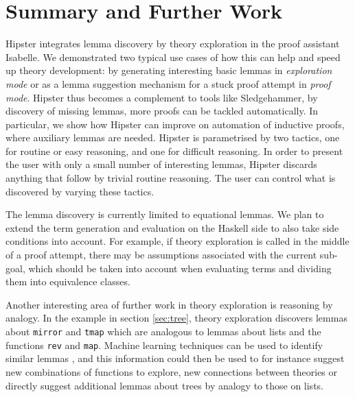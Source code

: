 \section{Summary and Further Work}
\label{sec:concl}

Hipster integrates lemma discovery by theory exploration in the proof assistant Isabelle. We demonstrated two typical use cases of how this can help and speed up theory development: by generating interesting basic lemmas in \emph{exploration mode} or as a lemma suggestion mechanism for a stuck proof attempt in \emph{proof mode}. Hipster thus becomes a complement to tools like Sledgehammer, by discovery of missing lemmas, more proofs can be tackled automatically. In particular, we show how Hipster can improve on automation of inductive proofs, where auxiliary lemmas are needed. Hipster is parametrised by two tactics, one for routine or easy reasoning, and one for difficult reasoning. In order to present the user with only a small number of interesting lemmas, Hipster discards anything that follow by trivial routine reasoning. The user can control what is discovered by varying these tactics.

The lemma discovery is currently limited to equational lemmas. We plan to extend the term generation and evaluation on the Haskell side to also take side conditions into account. For example, if theory exploration is called in the middle of a proof attempt, there may be assumptions associated with the current sub-goal, which should be taken into account when evaluating terms and dividing them into equivalence classes. 

Another interesting area of further work in theory exploration is reasoning by analogy. In the example in section \ref{sec:tree}, theory exploration discovers lemmas about \texttt{mirror} and \texttt{tmap} which are analogous to lemmas about lists and the functions \texttt{rev} and \texttt{map}. Machine learning techniques can be used to identify similar lemmas \cite{acl2ml}, and this information could then be used to for instance suggest new combinations of functions to explore, new connections between theories or directly suggest additional lemmas about trees by analogy to those on lists.  

